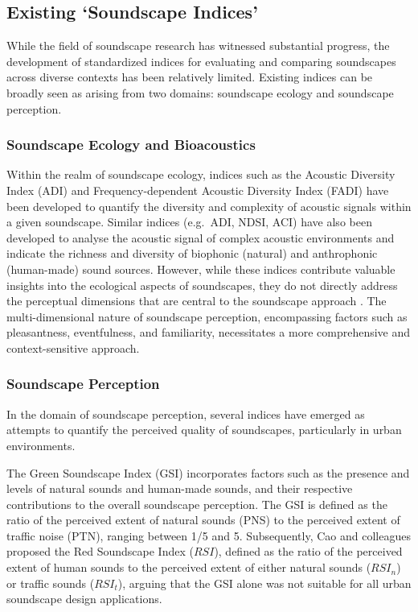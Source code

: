 \documentclass[
  authoryear,
  preprint,
  1p]{elsarticle}
\begin{document}
\subsection{Existing `Soundscape
Indices'}\label{sec-existing-soundscape-indices}

While the field of soundscape research has witnessed substantial
progress, the development of standardized indices for evaluating and
comparing soundscapes across diverse contexts has been relatively
limited. Existing indices can be broadly seen as arising from two
domains: soundscape ecology and soundscape perception.

\subsubsection{Soundscape Ecology and
Bioacoustics}\label{sec-soundscape-ecology-and-bioacoustics}

Within the realm of soundscape ecology, indices such as the Acoustic
Diversity Index (ADI) and Frequency-dependent Acoustic Diversity Index
(FADI) \citep{Xu2023frequency} have been developed to quantify the
diversity and complexity of acoustic signals within a given soundscape.
Similar indices (e.g.~ADI, NDSI, ACI) have also been developed to
analyse the acoustic signal of complex acoustic environments and
indicate the richness and diversity of biophonic (natural) and
anthrophonic (human-made) sound sources. However, while these indices
contribute valuable insights into the ecological aspects of soundscapes,
they do not directly address the perceptual dimensions that are central
to the soundscape approach \citep{SchulteFortkamp2023Soundscapes}. The
multi-dimensional nature of soundscape perception, encompassing factors
such as pleasantness, eventfulness, and familiarity, necessitates a more
comprehensive and context-sensitive approach.

\subsubsection{Soundscape Perception}\label{sec-soundscape-perception}

In the domain of soundscape perception, several indices have emerged as
attempts to quantify the perceived quality of soundscapes, particularly
in urban environments.

The Green Soundscape Index (GSI) \citep{Kogan2018Green} incorporates
factors such as the presence and levels of natural sounds and human-made
sounds, and their respective contributions to the overall soundscape
perception. The GSI is defined as the ratio of the perceived extent of
natural sounds (PNS) to the perceived extent of traffic noise (PTN),
ranging between 1/5 and 5. Subsequently, Cao and colleagues
\citep{Cao2020Red, Yang2022Effects} proposed the Red Soundscape Index
(\(RSI\)), defined as the ratio of the perceived extent of human sounds
to the perceived extent of either natural sounds (\(RSI_n\)) or traffic
sounds (\(RSI_t\)), arguing that the GSI alone was not suitable for all
urban soundscape design applications.
\end{document}
